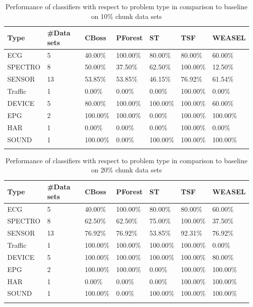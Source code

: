 \begin{table}[hp!]
	\setlength\extrarowheight{2pt} %
	\begin{tabularx}{\textwidth}{|X|X|X|X|X|X|X|}
	\hline
	\textbf{Type} & \textbf{\#Data sets} & \textbf{CBoss} & \textbf{PForest} & \textbf{ST} & \textbf{TSF} & \textbf{WEASEL} \\ \hline
		ECG & 5 & 40.00\% & 100.00\% & 80.00\% & 80.00\% & 60.00\% \\ \hline
		SPECTRO & 8 &50.00\% & 37.50\% & 62.50\% & 100.00\% & 12.50\% \\ \hline
		SENSOR & 13 & 53.85\% & 53.85\% & 46.15\% & 76.92\% & 61.54\% \\ \hline
		Traffic & 1 & 0.00\% & 0.00\% & 0.00\% & 100.00\% & 0.00\% \\ \hline
		DEVICE & 5 & 80.00\% & 100.00\% & 100.00\% & 100.00\% & 60.00\% \\ \hline
		EPG & 2 & 100.00\% & 100.00\% & 0.00\% & 100.00\% & 100.00\% \\ \hline
		HAR & 1 & 0.00\% & 0.00\% & 0.00\% & 100.00\% & 0.00\% \\ \hline
		SOUND & 1 & 100.00\% & 0.00\% & 100.00\% & 100.00\% & 100.00\% \\ \hline
  \caption{Performance of classifiers with respect to problem type in comparison to baseline on 10\% chunk data sets}
  \label{TableType10}
  \end{tabularx}
\end{table}

\begin{table}[hp!]
	\setlength\extrarowheight{2pt} %
	\begin{tabularx}{\textwidth}{|X|X|X|X|X|X|X|}
	\hline
	\textbf{Type} & \textbf{\#Data sets} & \textbf{CBoss} & \textbf{PForest} & \textbf{ST} & \textbf{TSF} & \textbf{WEASEL} \\ \hline
		ECG & 5 & 40.00\% & 100.00\% & 80.00\% & 80.00\% & 60.00\% \\ \hline
		SPECTRO & 8 &62.50\% & 62.50\% & 75.00\% & 100.00\% & 37.50\% \\ \hline
		SENSOR & 13 & 76.92\% & 76.92\% & 53.85\% & 92.31\% & 76.92\% \\ \hline
		Traffic & 1 & 100.00\% & 100.00\% & 100.00\% & 100.00\% & 0.00\% \\ \hline
		DEVICE & 5 & 100.00\% & 100.00\% & 100.00\% & 100.00\% & 80.00\% \\ \hline
		EPG & 2 & 100.00\% & 100.00\% & 0.00\% & 100.00\% & 100.00\% \\ \hline
		HAR & 1 & 0.00\% & 0.00\% & 0.00\% & 100.00\% & 100.00\% \\ \hline
		SOUND & 1 & 100.00\% & 0.00\% & 100.00\% & 100.00\% & 100.00\% \\ \hline
  \caption{Performance of classifiers with respect to problem type in comparison to baseline on 20\% chunk data sets}
  \label{TableType20}
  \end{tabularx}
\end{table}

